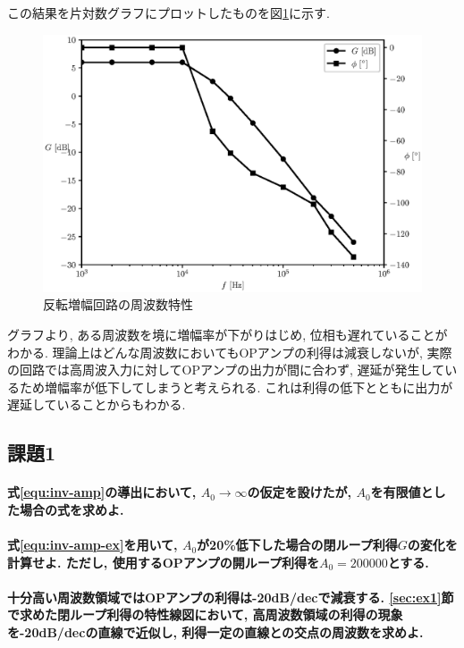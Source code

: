 \documentclass[titlepage]{jsarticle}
\begin{document}
        この結果を片対数グラフにプロットしたものを図\ref{fig:inv-amp-graph1}に示す.

        \begin{figure}[h]
            \centering
            \includegraphics[width=0.8\hsize]{img/inv-amp-graph1.eps}
            \caption{反転増幅回路の周波数特性}
            \label{fig:inv-amp-graph1}
        \end{figure}

        グラフより,
        ある周波数を境に増幅率が下がりはじめ,
        位相も遅れていることがわかる.
        理論上はどんな周波数においてもOPアンプの利得は減衰しないが,
        実際の回路では高周波入力に対してOPアンプの出力が間に合わず,
        遅延が発生しているため増幅率が低下してしまうと考えられる.
        これは利得の低下とともに出力が遅延していることからもわかる.

    \subsection{課題1}
        \paragraph{
            式\ref{equ:inv-amp}の導出において,
            $A_0 \rightarrow \infty$の仮定を設けたが,
            $A_0$を有限値とした場合の式を求めよ.
        }

        \paragraph{
            式\ref{equ:inv-amp-ex}を用いて,
            $A_0$が20\%低下した場合の閉ループ利得$G$の変化を計算せよ.
            ただし, 使用するOPアンプの開ループ利得を$A_0 = 200000$とする.
        }

        \paragraph{
            十分高い周波数領域ではOPアンプの利得は-20dB/decで減衰する.
            \ref{sec:ex1}節で求めた閉ループ利得の特性線図において,
            高周波数領域の利得の現象を-20dB/decの直線で近似し,
            利得一定の直線との交点の周波数を求めよ.
        }
\end{document}

